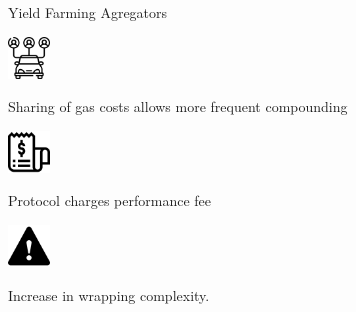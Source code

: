 \documentclass[handout]{beamer}
\begin{document}
\begin{frame}{Yield Farming Agregators}



		\begin{minipage}{0.2\textwidth}
			\begin{center}
				\includegraphics[height=3em]{../assets/images/car.png}
			\end{center}
		\end{minipage}
		\hspace{1 em}
		\begin{minipage}{0.72\textwidth}
		Sharing of gas costs allows more frequent compounding
		\end{minipage}
		\pause
		\vspace{2 em}
		

		\begin{minipage}{0.2\textwidth}
			\begin{center}
				\includegraphics[height=3em]{../assets/images/fee.png}
			\end{center}
		\end{minipage}
		\hspace{1 em}
		\begin{minipage}{0.72\textwidth}
		Protocol charges performance fee
		\end{minipage}
		\pause
		\vspace{2 em}		
		
		
		\begin{minipage}{0.2\textwidth}
			\begin{center}
				\includegraphics[height=3em]{../assets/images/warning.png}
			\end{center}
		\end{minipage}
		\hspace{1 em}
		\begin{minipage}{0.72\textwidth}
		Increase in wrapping complexity. 
		\end{minipage}
		\pause
\end{frame}
\end{document}
